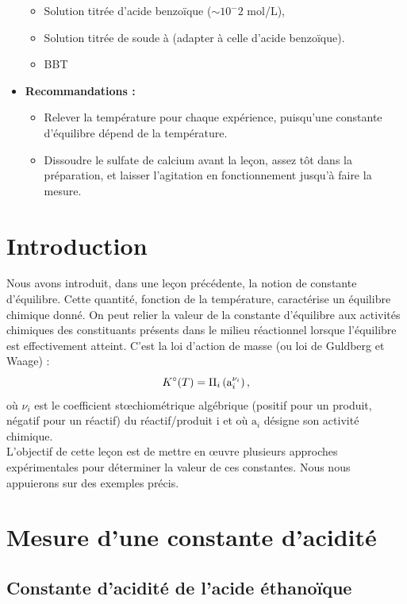 \documentclass[11pt,a4paper]{report}
\begin{document}
\begin{itemize}
\begin{itemize}
		\item Solution titrée d'acide benzoïque ($\sim 10^-2$ mol/L),
		\item Solution titrée de soude à (adapter à celle d'acide benzoïque).
		\item BBT
	\end{itemize}
		
	\item \textbf{Recommandations :}
	\begin{itemize}
		\item Relever la température pour chaque expérience, puisqu'une constante d'équilibre dépend 			de la température.
		\item Dissoudre le sulfate de calcium avant la leçon, assez tôt dans la préparation, et 					laisser l'agitation en fonctionnement jusqu'à faire la mesure.
	\end{itemize}
\end{itemize}

\newpage
\section*{Introduction}

Nous avons introduit, dans une leçon précédente, la notion de constante d'équilibre. Cette quantité, fonction de la température, caractérise un équilibre chimique donné. On peut relier la valeur de la constante d'équilibre aux activités chimiques des constituants présents dans le milieu réactionnel lorsque l'équilibre est effectivement atteint. C'est la loi d'action de masse (ou loi de Guldberg et Waage) :
\begin{equation}
	K\degree(T) = \Pi_{i}\left( \text{a}_i^{\nu_i} \right),
\end{equation}
où $\nu_i$ est le coefficient stœchiométrique algébrique (positif pour un produit, négatif pour un réactif) du réactif/produit i et où $\text{a}_i$ désigne son activité chimique.\\

L'objectif de cette leçon est de mettre en œuvre plusieurs approches expérimentales pour déterminer la valeur de ces constantes. Nous nous appuierons sur des exemples précis.

\section{Mesure d'une constante d'acidité}\label{sec:1}

\subsection{Constante d'acidité de l'acide éthanoïque}
\end{document}
